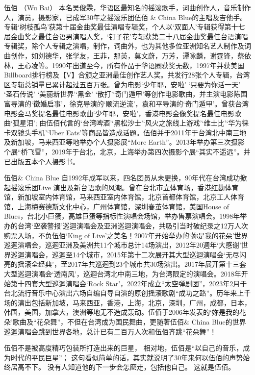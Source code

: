 \documentclass[UTF8,a4paper,oneside,twocolumn,12pt]{ctexbook}
\begin{document}
伍佰 （Wu Bai）
本名吴俊霖，华语区最知名的摇滚歌手，词曲创作人，音乐制作人，演员，摄影家，已成军30年之摇滚乐团伍佰 \& China Blue的主唱及吉他手。专辑‘树枝孤鸟’获第十届金曲奖最佳演唱专辑奖，个人以‘双面人’专辑获得第十七届金曲奖之最佳台语男演唱人奖，‘钉子花’专辑获第二十八届金曲奖最佳台语演唱专辑奖，除个人专辑之演唱，制作，词曲外，也为其他多位亚洲知名艺人制作及词曲创作，如刘德华，张学友，王菲，那英，莫文蔚，万芳，谭咏麟，谢霆锋，蔡依林，王心凌等。1990年出道至今，所有作品于华语圈获奖无数，1997年并获美国Billboard排行榜及【V】合颁之亚洲最佳创作艺人奖。共发行28张个人专辑，台湾区专辑总销量已累计超过五百万张。曾为电影‘少年耶，安啦’ ‘只要为你活一天’ ‘圣石传说’ ‘美丽新世界’‘黑金’ ‘散打’‘奇门遁甲’等创作电影歌曲，并主演电影陈国富导演的‘徵婚启事’，徐克导演的‘顺流逆流’，袁和平导演的‘奇门遁甲’。曾获台湾电影金马奖提名最佳电影歌曲‘少年耶，安啦’，香港电影金像奖提名最佳电影歌曲‘孤星泪’; 由伍佰代言的‘台湾啤酒’‘黑松沙士’‘风火之旅线上游戏’‘维士比’‘华为徕卡双镜头手机’‘Uber Eats’等商品皆造成话题。伍佰并于2011年于台湾北中南三地及新加坡，马来西亚等地举办个人摄影展“More Earth”。2013年举办第三次摄影个展“桥飞雪”，2019年于台北，北京，上海举办第四次摄影个展“其实不遥远”。并已出版五本个人摄影书。

伍佰\& China Blue 自1992年成军以来，四名团员从未更换，90年代在台湾成功掀起摇滚乐团Live 演出及新台语歌的风潮。曾在台北市立体育场，香港红勘体育馆，新加坡室内体育馆，马来西亚室内体育馆，北京首都体育馆，北京工人体育馆，上海梅赛德斯文化中心，广州体育馆，深圳春茧体育馆，美国House of Blues，台北小巨蛋，高雄巨蛋等指标性演唱会场馆，举办售票演唱会。1998年举办的台湾‘空袭警报’巡迴演唱会及亚洲巡迴演唱会，共吸引当时破纪录之12万人次购票入场，不负伍佰‘King of Live’之美名！2007年开始举办的‘妳是我的花朵’世界巡迴演唱会，巡迴亚洲及美洲共11个城市总计14场演出，2012年20週年‘大感谢’世界巡迴演唱会，巡迴至14个城市，2015年第十二次展开其大型巡迴演唱会‘无尽闪亮的摇滚全经典’，至2017年共巡迴到23个城市共30场演出。2017年展开第十三套大型巡迴演唱会‘透南风’，巡迴台湾北中南三地，为台湾限定的演唱会。2018年开始第十四套大型巡迴演唱会‘Rock Star’，2022年成立“太空弹剧团”，2023年2月于台北流行音乐中心演出六场自编自导自演的原创摇滚歌剧“成功之路”。历年来上千场的演出包括新加坡，马来西亚，香港，上海，北京，深圳，广州，成都，日本，韩国，美国，加拿大，澳洲等地无不造成轰动。伍佰于2006年发表的‘妳是我的花朵’歌曲及“花朵舞”，不但在台湾成为国民舞曲，更随著伍佰\& China Blue的世界巡迴演唱会跳到世界各地，总计已有二百万人次和伍佰齐跳“花朵舞”！

伍佰不是被高度精巧包装所打造出来的巨星，
相对地，伍佰是“以自己的音乐，成为时代的平民巨星”；
这句看似简单的话，其实就说明了30年来何以伍佰的声势始终居高不下。
没有人知道他的下一步会怎麽走，包括他自己。
这就是伍佰。
\end{document}
